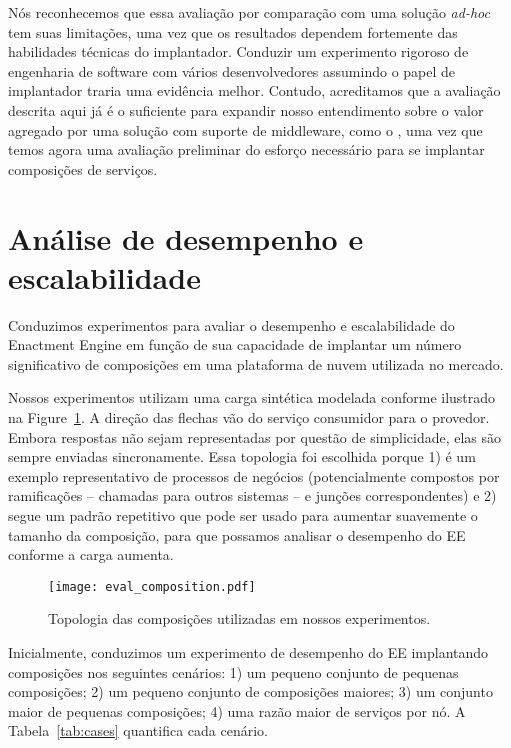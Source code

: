 Nós reconhecemos que essa avaliação por comparação com uma solução \emph{ad-hoc}
tem suas limitações, uma vez que os resultados dependem fortemente das
habilidades técnicas do implantador.
Conduzir um experimento rigoroso de engenharia de software com vários
desenvolvedores assumindo o papel de implantador traria uma evidência melhor.
Contudo, acreditamos que a avaliação descrita aqui já é o suficiente
para expandir nosso entendimento sobre o valor agregado por uma solução
com suporte de middleware, como o \ee, uma vez que temos agora uma avaliação preliminar
do esforço necessário para se implantar composições de serviços.

\section{Análise de desempenho e escalabilidade}
\label{sec:avaliacao_quantitativa}

Conduzimos experimentos para avaliar o desempenho e escalabilidade do
Enactment Engine em função de sua capacidade de implantar um número significativo
de composições em uma plataforma de nuvem utilizada no mercado.

Nossos experimentos utilizam uma carga sintética modelada conforme ilustrado na Figure~\ref{fig:eval_composition}.
A direção das flechas vão do serviço consumidor para o provedor.
Embora respostas não sejam representadas por questão de simplicidade,
elas são sempre enviadas sincronamente.
Essa topologia foi escolhida porque 1) é um exemplo representativo de processos de negócios
(potencialmente compostos por ramificações -- chamadas para outros sistemas -- e junções correspondentes)
e 2) segue um padrão repetitivo que pode ser usado para aumentar suavemente o tamanho da composição,
para que possamos analisar o desempenho do EE conforme a carga aumenta.


\begin{figure}[h]
  \centering
  \texttt{[image: eval\_composition.pdf]}
  \caption{Topologia das composições utilizadas em nossos experimentos.}
  \label{fig:eval_composition}
\end{figure}


Inicialmente, conduzimos um experimento
de desempenho do EE implantando composições nos seguintes cenários:
1) um pequeno conjunto de pequenas composições;
2) um pequeno conjunto de composições maiores;
3) um conjunto maior de pequenas composições;
4) uma razão maior de serviços por nó.
A Tabela~\ref{tab:cases} quantifica cada cenário.

